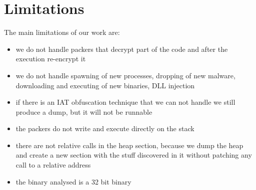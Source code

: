 \chapter{Limitations}
\label{chapter6}
\thispagestyle{empty}

The main limitations of our work are:
\begin{itemize}
\item we do not handle packers that decrypt part of the code and after the execution re-encrypt it
\item we do not handle spawning of new processes, dropping of new malware, downloading and executing of new binaries, DLL injection 
\item if there is an IAT obfuscation technique that we can not handle we still produce a dump, but it will not be runnable
\item the packers do not write and execute directly on the stack
\item there are not relative calls in the heap section, because we dump the heap and create a new section with the stuff discovered in it without patching any call to a relative address 
\item the binary analysed is a 32 bit binary
\end{itemize}